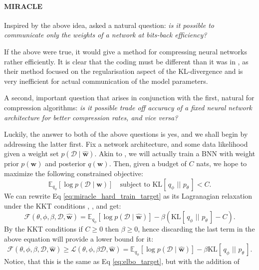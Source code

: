 \documentclass{article}
\renewcommand{\vec}[1]{\mathbf{#1}}
\newcommand{\F}{\mathcal{F}}
\renewcommand{\L}{\mathcal{L}}
\newcommand{\KL}[2]{\mathrm{KL}[\,#1\,\,||\,\,#2\,]}
\newcommand{\Exp}{\mathbb{E}}
\newcommand{\Data}{\mathcal{D}}
\begin{document}
\paragraph{MIRACLE}
Inspired by the above idea, \cite{havasi2018minimal} asked a natural question:
\textit{is it possible to communicate only the weights of a network at
  bits-back efficiency?}
\par
If the above were true, it would give a method for compressing neural networks
rather efficiently. It is clear that the coding must be different than it was in
\cite{hinton1993keeping}, as their method focused on the regularisation aspect
of the KL-divergence and is very inefficient for actual communication of the
model parameters.
\par
A second, important question that arises in conjunction with the first, natural
for compression algorithms:
\textit{is it possible trade off accuracy of a fixed neural network architecture
  for better compression rates, and vice versa?}
\par
Luckily, the answer to both of the above questions is yes, and we shall begin by
addressing the latter first. Fix a network architecture, and some data
likelihood given a weight set $p(\Data \mid \vec{\hat{w}})$. Akin to
\cite{hinton1993keeping}, we will actually train a BNN with weight prior
$p(\vec{w})$ and posterior $q(\vec{w})$. Then, given a budget of $C$ nats, we
hope to maximize the following constrained objective:
\begin{equation}
\label{eq:miracle_hard_train_target}
\Exp_{q_\phi}[\log p(\Data \mid \vec{w})] \quad \text{subject to }
\KL{q_{\phi}}{p_{\theta}} < C.
\end{equation}
We can rewrite Eq \ref{eq:miracle_hard_train_target} as its Lagranagian
relaxation under the KKT conditions \cite{karush2014minima},
\cite{kuhn2014nonlinear}, \cite{higgins2017beta} and get:
\[
  \F(\theta, \phi, \beta, \Data, \vec{\hat{w}}) = 
  \Exp_{q_\phi}[\log p(\Data \mid \vec{\hat{w}})] - \beta (\KL{q_{\phi}}{p_{\theta}} - C).
\]
By the KKT conditions if $C \geq 0$ then $\beta \geq 0$, hence discarding the last
term in the above equation will provide a lower bound for it:
\begin{equation}
\label{eq:miracle_train_target}
\F(\theta, \phi, \beta, \Data, \vec{\hat{w}}) \geq
\L(\theta, \phi, \beta \Data, \vec{\hat{w}}) =
\Exp_{q_\phi}[\log p(\Data \mid \vec{\hat{w}})] - \beta \KL{q_{\phi}}{p_{\theta}}.
\end{equation}
Notice, that this is the same as Eq \ref{eq:elbo_target}, but with the addition of
\end{document}
